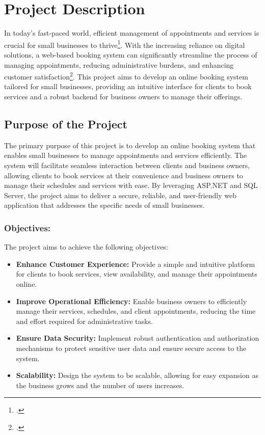 \chapter{Project Description}
\label{ch:project-description}
In today's fast-paced world, efficient management of appointments and services is crucial for small businesses to thrive\footcite[][]{missing}.
With the increasing reliance on digital solutions, a web-based booking system can significantly streamline the process of managing appointments, reducing administrative burdens, and enhancing customer satisfaction\footcite[][]{missing}.
This project aims to develop an online booking system tailored for small businesses, providing an intuitive interface for clients to book services and a robust backend for business owners to manage their offerings.

\section{Purpose of the Project}
\label{sec:purpose-of-the-project}
The primary purpose of this project is to develop an online booking system that enables small businesses to manage appointments and services efficiently. The system will facilitate seamless interaction between clients and business owners, allowing clients to book services at their convenience and business owners to manage their schedules and services with ease. By leveraging ASP.NET and SQL Server, the project aims to deliver a secure, reliable, and user-friendly web application that addresses the specific needs of small businesses.

\subsection*{Objectives:}
\label{subsec:pj-objectives}
The project aims to achieve the following objectives:
\begin{itemize}
    \item \textbf{Enhance Customer Experience:} Provide a simple and intuitive platform for clients to book services, view availability, and manage their appointments online.
    \item \textbf{Improve Operational Efficiency:} Enable business owners to efficiently manage their services, schedules, and client appointments, reducing the time and effort required for administrative tasks.
    \item \textbf{Ensure Data Security:} Implement robust authentication and authorization mechanisms to protect sensitive user data and ensure secure access to the system.
    \item \textbf{Scalability:} Design the system to be scalable, allowing for easy expansion as the business grows and the number of users increases.
\end{itemize}


